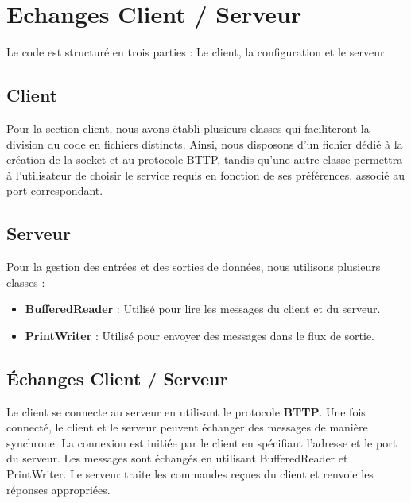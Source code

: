 \chapter*{Echanges Client / Serveur}

    Le code est structuré en trois parties : Le client, la configuration et le serveur.

    \bigskip

    \section{Client}

    \bigskip

    Pour la section client, nous avons établi plusieurs classes qui faciliteront la division du code en fichiers distincts.
    Ainsi, nous disposons d'un fichier dédié à la création de la socket et au protocole BTTP, tandis
    qu'une autre classe permettra à l'utilisateur de choisir le service requis en fonction de ses préférences, associé au
    port correspondant.

    \bigskip

    \section{Serveur}

    \bigskip

    Pour la gestion des entrées et des sorties de données, nous utilisons plusieurs classes :

    \begin{itemize}
        \item \textbf{BufferedReader} : Utilisé pour lire les messages du client et du serveur.
        \item \textbf{PrintWriter} : Utilisé pour envoyer des messages dans le flux de sortie.
    \end{itemize}

    \bigskip

    \section{Échanges Client / Serveur}


    Le client se connecte au serveur en utilisant le protocole \textbf{BTTP}. Une fois connecté, le client et le serveur peuvent
    échanger des messages de manière synchrone. La connexion est initiée par le client en spécifiant l'adresse et le port du serveur.
    Les messages sont échangés en utilisant BufferedReader et PrintWriter. Le serveur traite les commandes reçues du client et renvoie les réponses appropriées.

